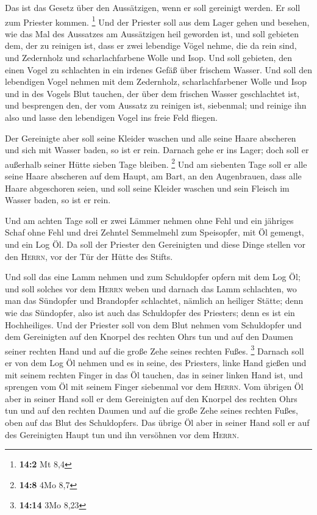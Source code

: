  Das ist das Gesetz über den Aussätzigen, wenn er soll
gereinigt werden. Er soll zum Priester kommen. \footnote{\textbf{14:2}
  Mt 8,4}  Und der Priester soll aus dem Lager gehen und
besehen, wie das Mal des Aussatzes am Aussätzigen heil geworden ist,
 und soll gebieten dem, der zu reinigen ist, dass er zwei
lebendige Vögel nehme, die da rein sind, und Zedernholz und
scharlachfarbene Wolle und Isop.  Und soll gebieten, den
einen Vogel zu schlachten in ein irdenes Gefäß über frischem Wasser.
 Und soll den lebendigen Vogel nehmen mit dem Zedernholz,
scharlachfarbener Wolle und Isop und in des Vogels Blut tauchen, der
über dem frischen Wasser geschlachtet ist,  und besprengen
den, der vom Aussatz zu reinigen ist, siebenmal; und reinige ihn also
und lasse den lebendigen Vogel ins freie Feld fliegen.

 Der Gereinigte aber soll seine Kleider waschen und alle
seine Haare abscheren und sich mit Wasser baden, so ist er rein. Darnach
gehe er ins Lager; doch soll er außerhalb seiner Hütte sieben Tage
bleiben. \footnote{\textbf{14:8} 4Mo 8,7}  Und am
siebenten Tage soll er alle seine Haare abscheren auf dem Haupt, am
Bart, an den Augenbrauen, dass alle Haare abgeschoren seien, und soll
seine Kleider waschen und sein Fleisch im Wasser baden, so ist er rein.

 Und am achten Tage soll er zwei Lämmer nehmen ohne Fehl
und ein jähriges Schaf ohne Fehl und drei Zehntel Semmelmehl zum
Speisopfer, mit Öl gemengt, und ein Log Öl.  Da soll der
Priester den Gereinigten und diese Dinge stellen vor den \textsc{Herrn},
vor der Tür der Hütte des Stifts.

 Und soll das eine Lamm nehmen und zum Schuldopfer opfern
mit dem Log Öl; und soll solches vor dem \textsc{Herrn} weben
 und darnach das Lamm schlachten, wo man das Sündopfer
und Brandopfer schlachtet, nämlich an heiliger Stätte; denn wie das
Sündopfer, also ist auch das Schuldopfer des Priesters; denn es ist ein
Hochheiliges.  Und der Priester soll von dem Blut nehmen
vom Schuldopfer und dem Gereinigten auf den Knorpel des rechten Ohrs tun
und auf den Daumen seiner rechten Hand und auf die große Zehe seines
rechten Fußes. \footnote{\textbf{14:14} 3Mo 8,23} 
Darnach soll er von dem Log Öl nehmen und es in seine, des Priesters,
linke Hand gießen  und mit seinem rechten Finger in das
Öl tauchen, das in seiner linken Hand ist, und sprengen vom Öl mit
seinem Finger siebenmal vor dem \textsc{Herrn}.  Vom
übrigen Öl aber in seiner Hand soll er dem Gereinigten auf den Knorpel
des rechten Ohrs tun und auf den rechten Daumen und auf die große Zehe
seines rechten Fußes, oben auf das Blut des Schuldopfers.
 Das übrige Öl aber in seiner Hand soll er auf des
Gereinigten Haupt tun und ihn versöhnen vor dem \textsc{Herrn}.

